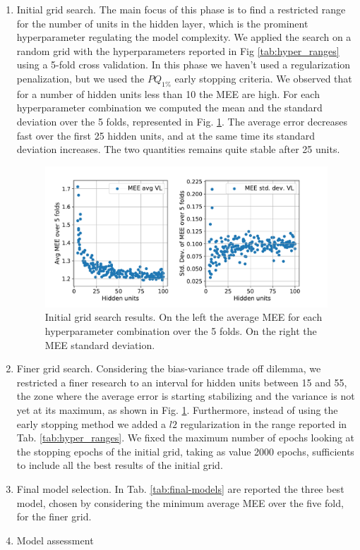 \documentclass[11pt,twoside]{article}
\begin{document}
\begin{enumerate}
\item Initial grid search. The main focus of this phase is to find a restricted range for the number of units in the hidden layer, which is the prominent hyperparameter regulating the model complexity. We applied the search on a random grid with the hyperparameters reported in Fig \ref{tab:hyper_ranges} using a 5-fold cross validation. In this phase we haven't used a regularization penalization, but we used the $PQ_{1\%}$ early stopping criteria. We observed that for a number of hidden units less than 10 the MEE are high. For each hyperparameter combination we computed the mean and the standard deviation over the 5 folds, represented in Fig. \ref{fig:initial-grid}. The average error decreases fast over the first 25 hidden units, and at the same time its standard deviation increases. The two quantities remains quite stable after 25 units.

  \begin{figure}[htbp]
    \centering
    \includegraphics[width=1.0\textwidth]{img/initial_grid.pdf}
\caption{Initial grid search results. On the left the average MEE for each hyperparameter combination over the 5 folds. On the right the MEE standard deviation.}
    \label{fig:initial-grid}
  \end{figure}


\item Finer grid search. Considering the bias-variance trade off dilemma, we restricted a finer research to an interval for hidden units between 15 and 55, the zone where the average error is starting stabilizing and the variance is not yet at its maximum, as shown in Fig. \ref{fig:initial-grid}. Furthermore, instead of using the early stopping method we added a $l2$ regularization in the range reported in Tab. \ref{tab:hyper_ranges}. We fixed the maximum number of epochs looking at the stopping epochs of the initial grid, taking as value 2000 epochs, sufficients to include all the best results of the initial grid.

\item Final model selection. In Tab. \ref{tab:final-models} are reported the three best model, chosen by considering the minimum average MEE over the five fold, for the finer grid. 


\item Model assessment  
  

\end{enumerate}
\end{document}
